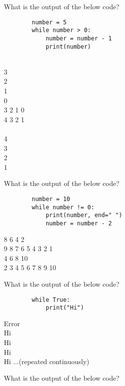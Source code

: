 \documentclass{exam}
\begin{document}
\begin{questions}
    \question What is the output of the below code?

    \begin{verbatim}
        number = 5
        while number > 0:
            number = number - 1 
            print(number)
    \end{verbatim}
    \begin{oneparchoices}
         \\ 3 \\ 2 \\ 1 \\ 0\\
         3 2 1 0 \\
         4 3 2 1 \\
         \\ 4 \\ 3\\ 2\\ 1
    \end{oneparchoices}
    \question What is the output of the below code?

    \begin{verbatim}
        number = 10
        while number != 0:
            print(number, end=" ")
            number = number - 2
    \end{verbatim}
    \begin{oneparchoices}
         8 6 4 2 \\
         9 8 7 6 5 4 3 2 1 \\
         4 6 8 10 \\
         2 3 4 5 6 7 8 9 10
    \end{oneparchoices}

    \question What is the output of the below code?
    
    \begin{verbatim}
        while True:
            print("Hi")
    \end{verbatim}

    \begin{oneparchoices}
        \choice Error \\
        \choice Hi \\
        \choice Hi \\ Hi\\ Hi ...(repeated continuously)
    \end{oneparchoices}

    \question What is the output of the below code?


\end{questions}
\end{document}
